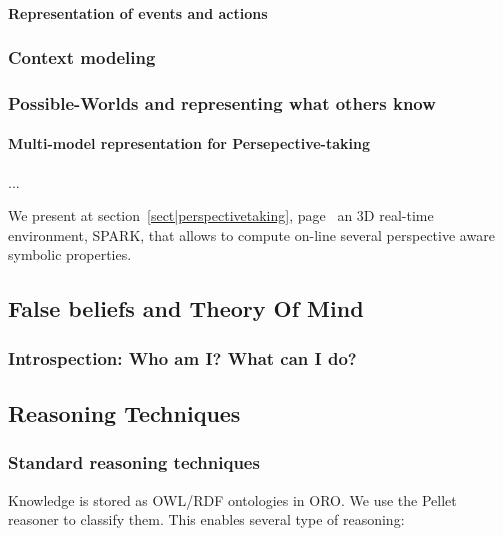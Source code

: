 \paragraph{Representation of events and actions}

\subsubsection{Context modeling}
\subsubsection{Possible-Worlds and representing what others know}

\paragraph{Multi-model representation for Persepective-taking}
\label{sect|alterite}

...

We present at section~\ref{sect|perspectivetaking}, page~\pageref{sect|perspectivetaking} an 3D real-time environment, SPARK, that allows to compute on-line several perspective aware symbolic properties.

\subsection{False beliefs and Theory Of Mind}
\label{sect|theory-of-mind}



\subsubsection{Introspection: Who am I? What can I do?}

\subsection{Reasoning Techniques}

\subsubsection{Standard reasoning techniques}


Knowledge is stored as OWL/RDF ontologies in ORO. We use the Pellet reasoner to
classify them. This enables several type of reasoning:

